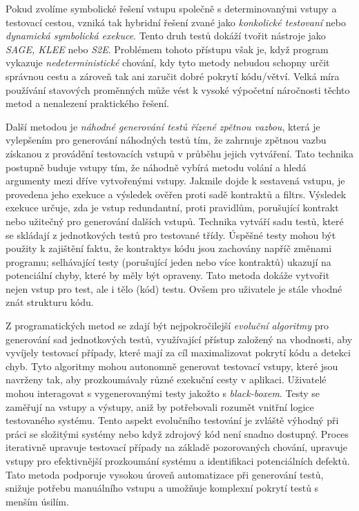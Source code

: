 \documentclass[czech, ma, kiv, he, iso690alph, pdf, viewonly]{fasthesis}
\begin{document}
        Pokud zvolíme symbolické řešení vstupu společně s determinovanými vstupy a testovací cestou, vzniká tak hybridní řešení zvané jako \emph{konkolické testovaní} nebo \emph{dynamická symbolická exekuce}. Tento druh testů dokáží tvořit nástroje jako \textit{SAGE, KLEE} nebo \textit{S2E}. Problémem tohoto přístupu však je, když program vykazuje \emph{nedeterministické} chování, kdy tyto metody nebudou schopny určit správnou cestu a zároveň tak ani zaručit dobré pokrytí kódu/větví. Velká míra používání stavových proměnných může vést k vysoké výpočetní náročnosti těchto metod a nenalezení praktického řešení. \cite{engler2006exe} \cite{sen2005cute} \cite{zhou2006safedrive}

        Další metodou je \textit{náhodné generování testů řízené zpětnou vazbou}, která je vylepšením pro generování náhodných testů tím, že zahrnuje zpětnou vazbu získanou z provádění testovacích vstupů v průběhu jejich vytváření. Tato technika postupně buduje vstupy tím, že náhodně vybírá metodu volání a hledá argumenty mezi dříve vytvořenými vstupy. Jakmile dojde k sestavená vstupu, je provedena jeho exekuce a výsledek ověřen proti sadě \gls{kontrakt}ů a \glspl{filtr}. Výsledek exekuce určuje, zda je vstup redundantní, proti pravidlům, porušující \gls{kontrakt} nebo užitečný pro generování dalších vstupů. Technika vytváří sadu testů, které se skládají z jednotkových testů pro testované třídy. Úspěšné testy mohou být použity k zajištění faktu, že \glspl{kontrakty} kódu jsou zachovány napříč změnami programu; selhávající testy (porušující jeden nebo více kontraktů) ukazují na potenciální chyby, které by měly být opraveny. Tato metoda dokáže vytvořit nejen vstup pro test, ale i tělo (kód) testu. Ovšem pro uživatele je stále vhodné znát strukturu kódu. \cite{FeedbackDirectedRT}

        Z programatických metod se zdají být nejpokročilejší \emph{evoluční algoritmy} pro generování sad jednotkových testů, využívající přístup založený na vhodnosti, aby vyvíjely testovací případy, které mají za cíl maximalizovat pokrytí kódu a detekci chyb. Tyto algoritmy mohou autonomně generovat testovací vstupy, které jsou navrženy tak, aby prozkoumávaly různé exekuční cesty v aplikaci. Uživatelé mohou interagovat s vygenerovanými testy jakožto s \textit{black-boxem}. Testy se zaměřují na vstupy a výstupy, aniž by potřebovali rozumět vnitřní logice testovaného systému. Tento aspekt evolučního testování je zvláště výhodný při práci se složitými systémy nebo když zdrojový kód není snadno dostupný. Proces iterativně upravuje testovací případy na základě pozorovaných chování, upravuje vstupy pro efektivnější prozkoumání systému a identifikaci potenciálních defektů. Tato metoda podporuje vysokou úroveň automatizace při generování testů, snižuje potřebu manuálního vstupu a umožňuje komplexní pokrytí testů s menším úsilím. \cite{CAMPOS2018207} \cite{abs-2111-05003}
\end{document}
